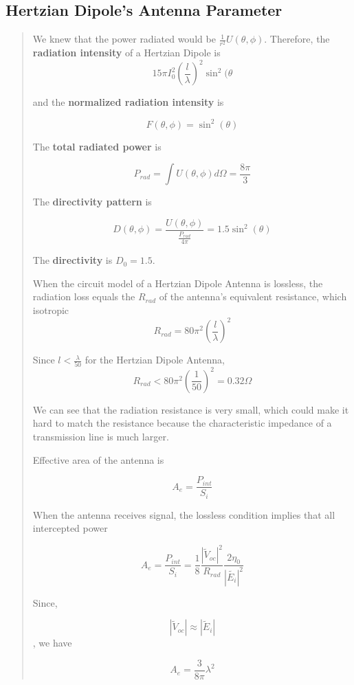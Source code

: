 \documentclass{article} %
\begin{document}
\subsection{Hertzian Dipole's Antenna Parameter}
\begin{quote}
    We knew that the power radiated would be $\frac{1}{r^2} U(\theta, \phi)$. Therefore, the \textbf{radiation intensity} of a Hertzian Dipole is
    \[15 \pi I_0 ^2\left(\frac{l}{\lambda}\right)^2 \sin^2(\theta\]

    and the \textbf{normalized radiation intensity} is

    \[F(\theta, \phi) = \sin^2(\theta)\]

    The \textbf{total radiated power} is

    \[P_{rad} = \int U(\theta, \phi) d\Omega = \frac{8 \pi}{3}\]

    The \textbf{directivity pattern} is

    \[D(\theta,\phi) = \frac{U(\theta, \phi)}{\frac{P_{rad}}{4 \pi}} = 1.5 \sin^2(\theta)\]

    The \textbf{directivity} is $D_0 = 1.5$.

    When the circuit model of a Hertzian Dipole Antenna is lossless, the radiation loss equals the $R_{rad}$ of the antenna's equivalent resistance, which isotropic
    \[R_{rad} = 80 \pi^2 \left(\frac{l}{\lambda}\right)^2\]

    Since $l < \frac{\lambda}{50}$ for the Hertzian Dipole Antenna,
    \[R_{rad} < 80 \pi^2 \left(\frac{1}{50}\right)^2 = 0.32 \Omega\]

    We can see that the radiation resistance is very small, which could make it hard to match the resistance because the characteristic impedance of a transmission line is much larger.

    Effective area of the antenna is

    \[A_e = \frac{P_{int}}{S_i}\]

    When the antenna receives signal, the lossless condition implies that all intercepted power

    \[A_e = \frac{P_{int}}{S_i} = \frac{1}{8}\frac{|\tilde{V}_{oc}|^2}{R_{rad}} \frac{2 \eta_0}{|\tilde{E_i}|^2}\]

    Since,

    \[|\tilde{V}_{oc} | \approx | \tilde{E}_i|\], we have

    \[A_e = \frac{3}{8 \pi} \lambda^2\]


\end{quote}
\end{document}

